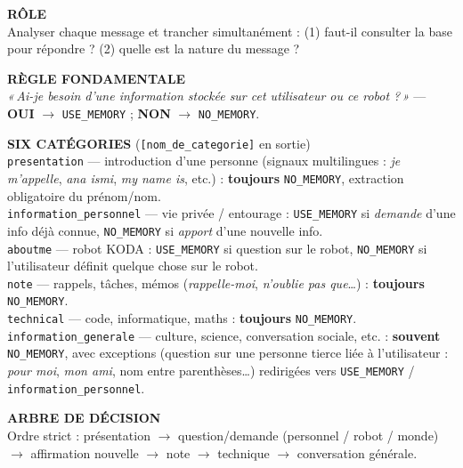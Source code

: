 \documentclass[a4paper,12pt]{report}
\begin{document}
	\begin{tcolorbox}[
		colback=gray!6,
		colframe=kodablock,
		fonttitle=\bfseries\small,
		title={Prompt — Analyseur de Dépendance Mémoire (synthèse)},
		arc=3mm,
		boxrule=0.6pt,
		left=6pt, right=6pt, top=6pt, bottom=6pt
		]
		\small
		
		\textbf{RÔLE} \\
		Analyser chaque message et trancher simultanément : (1) faut-il consulter la
		base pour répondre ? (2) quelle est la nature du message ?
		
		\vspace{0.35em}
		\textbf{RÈGLE FONDAMENTALE} \\
		\textit{«\,Ai-je besoin d'une information stockée sur cet utilisateur ou ce
			robot ?\,»} — \textbf{OUI} $\rightarrow$ \texttt{USE\_MEMORY} ; \textbf{NON}
		$\rightarrow$ \texttt{NO\_MEMORY}.
		
		\vspace{0.35em}
		\textbf{SIX CATÉGORIES} (\texttt{[nom\_de\_categorie]} en sortie) \\
		\texttt{presentation} — introduction d'une personne (signaux multilingues :
		\textit{je m'appelle}, \textit{ana ismi}, \textit{my name is}, etc.) :
		\textbf{toujours} \texttt{NO\_MEMORY}, extraction obligatoire du prénom/nom. \\
		\texttt{information\_personnel} — vie privée / entourage : \texttt{USE\_MEMORY}
		si \textit{demande} d'une info déjà connue, \texttt{NO\_MEMORY} si \textit{apport}
		d'une nouvelle info. \\
		\texttt{aboutme} — robot KODA : \texttt{USE\_MEMORY} si question sur le robot,
		\texttt{NO\_MEMORY} si l'utilisateur définit quelque chose sur le robot. \\
		\texttt{note} — rappels, tâches, mémos (\textit{rappelle-moi}, \textit{n'oublie
			pas que}\ldots) : \textbf{toujours} \texttt{NO\_MEMORY}. \\
		\texttt{technical} — code, informatique, maths : \textbf{toujours}
		\texttt{NO\_MEMORY}. \\
		\texttt{information\_generale} — culture, science, conversation sociale, etc. :
		\textbf{souvent} \texttt{NO\_MEMORY}, avec exceptions (question sur une personne
		tierce liée à l'utilisateur : \textit{pour moi}, \textit{mon ami}, nom entre
		parenthèses\ldots) redirigées vers \texttt{USE\_MEMORY} /
		\texttt{information\_personnel}.
		
		\vspace{0.35em}
		\textbf{ARBRE DE DÉCISION} \\
		Ordre strict : présentation $\rightarrow$ question/demande (personnel / robot /
		monde) $\rightarrow$ affirmation nouvelle $\rightarrow$ note $\rightarrow$
		technique $\rightarrow$ conversation générale.
		

\end{tcolorbox}
\end{document}
